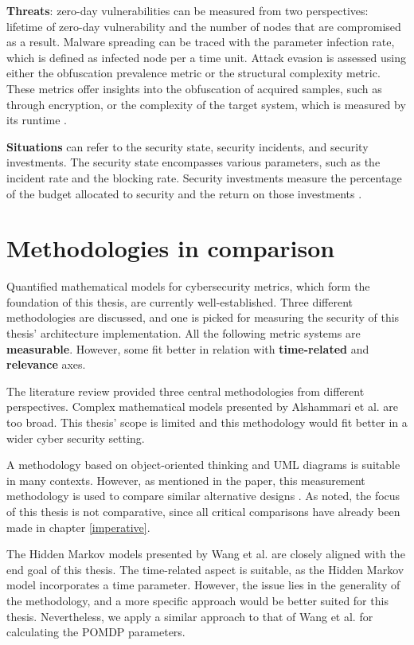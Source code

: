 \textbf{Threats}: zero-day vulnerabilities can be measured from two
perspectives: lifetime of zero-day vulnerability and the number of
nodes that are compromised as a result. Malware spreading can be
traced with the parameter infection rate, which is defined as infected
node per a time unit. Attack evasion is assessed using either the
obfuscation prevalence metric or the structural complexity
metric. These metrics offer insights into the obfuscation of acquired
samples, such as through encryption, or the complexity of the target
system, which is measured by its runtime \cite{pendleton2016survey,  ramos2017model}.

\textbf{Situations} can refer to the security state, security
incidents, and security investments. The security state encompasses
various parameters, such as the incident rate and the blocking
rate. Security investments measure the percentage
of the budget allocated to security and the return on those
investments \cite{pendleton2016survey}. 

\section{Methodologies in comparison} \label{whyqueries}

Quantified mathematical models for cybersecurity metrics, which form the foundation of this thesis, are currently well-established. Three
different methodologies are discussed, and one is picked for measuring
the security of this thesis' architecture implementation. All the following metric
systems are \textbf{measurable}. However, some fit better in relation with \textbf{time-related} and \textbf{relevance} axes.

The literature review provided three central methodologies from different perspectives. Complex mathematical models
presented by Alshammari et al. \cite{alshammari2009security} are too broad. This thesis' scope is limited and this
methodology would fit better in a wider cyber security setting.

A methodology based on object-oriented thinking and UML diagrams is
suitable in many contexts. However, as mentioned in the paper, this
measurement methodology is used to compare similar alternative designs
\cite{alshammari2009security}. As noted, the focus of this thesis is
not comparative, since all critical comparisons have already been made
in chapter \ref{imperative}.

The Hidden Markov models presented by Wang et al. \cite{wang2010framework} are closely aligned
with the end goal of this thesis. The
time-related aspect is suitable, as the Hidden Markov model
incorporates a time parameter. However, the issue lies in the
generality of the methodology, and a more specific approach would be
better suited for this thesis. Nevertheless, we apply a similar
approach to that of Wang et al. for calculating the POMDP parameters.

